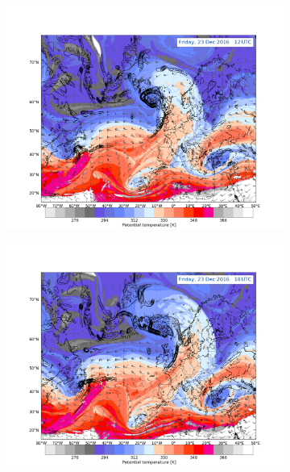 \begin{figure}[ht!]%
	\centering
	\begin{subfigure}[b]{0.49\textwidth}
		\includegraphics[trim={4.2cm 0cm 4.3cm 5.1cm},clip,
		width=\textwidth]{./fig_DynTropo/20161223_12}
		\caption{} \label{fig:DT23}
	\end{subfigure}
	\begin{subfigure}[b]{0.49\textwidth}
		\includegraphics[trim={4.2cm 0cm 4.3cm 5.1cm},clip,
		width=\textwidth]{./fig_DynTropo/20161223_18}
		\caption{} \label{fig:DT23_18}
	\end{subfigure}

\end{figure}
